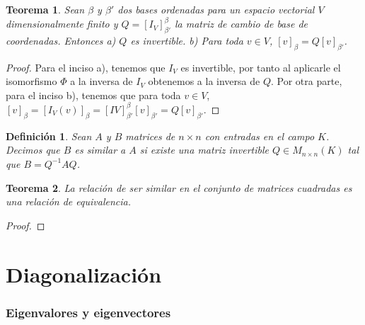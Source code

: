 \documentclass{book}
\newtheorem{theorem}{Teorema}
\newtheorem{definition}{Definición}
\begin{document}

\begin{theorem}
Sean $\beta$ y $\beta '$ dos bases ordenadas para un espacio vectorial $V$ dimensionalmente finito y $Q=[I_V]_{\beta '} ^{\beta}$ la matriz de cambio de base de coordenadas. Entonces \newline
a) $Q$ es invertible. \newline
b) Para toda $v\in V$, $[v]_{\beta}=Q[v]_{\beta'}$.
\end{theorem}

\begin{proof} %
Para el inciso a), tenemos que $I_V$ es invertible, por tanto al aplicarle el isomorfismo $\Phi$ a la inversa de $I_V$ obtenemos a la inversa de $Q$. Por otra parte, para el inciso b), tenemos que para toda $v\in V$, $[v]_{\beta}=[I_{V}(v)]_{\beta}=[I{V}]_{\beta '} ^{\beta} [v]_{\beta'}=Q[v]_{\beta'}$.
\end{proof}

\begin{definition}
Sean $A$ y $B$ matrices de $n \times n$ con entradas en el campo $K$. Decimos que $B$ es similar a $A$ si existe una matriz invertible $Q\in M_{n \times n}(K)$ tal que $B=Q^{-1}AQ$.
\end{definition}

\begin{theorem}
La relación de ser similar en el conjunto de matrices cuadradas es una relación de equivalencia.
\end{theorem}

\begin{proof}

\end{proof}

\chapter{Diagonalización}
\subsection{Eigenvalores y eigenvectores}
\end{document}
